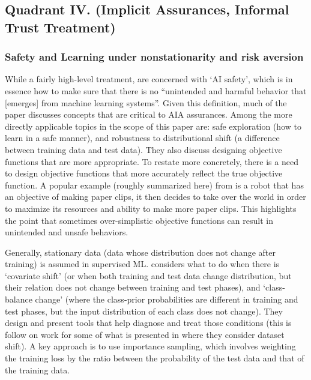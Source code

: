 \subsection{Quadrant IV. (Implicit Assurances, Informal Trust Treatment)}\label{sec:q4}



\subsubsection{Safety and Learning under nonstationarity and risk aversion} \label{sec:safety}
    While a fairly high-level treatment, \citet{Amodei2016-xi} are concerned with `AI safety', which is in essence how to make sure that there is no ``unintended and harmful behavior that [emerges] from machine learning systems''. Given this definition, much of the paper discusses concepts that are critical to AIA assurances. Among the more directly applicable topics in the scope of this paper are: safe exploration (how to learn in a safe manner), and robustness to distributional shift (a difference between training data and test data). They also discuss designing objective functions that are more appropriate. To restate more concretely, there is a need to design objective functions that more accurately reflect the true objective function. A popular example (roughly summarized here) from \citet{Bostrom2014-fz} is a robot that has an objective of making paper clips, it then decides to take over the world in order to maximize its resources and ability to make more paper clips. This highlights the point that sometimes over-simplistic objective functions can result in unintended and unsafe behaviors.

    Generally, stationary data (data whose distribution does not change after training) is assumed in supervised ML. \citet{Sugiyama2013-ci} considers what to do when there is `covariate shift' (or when both training and test data change distribution, but their relation does not change between training and test phases), and `class-balance change' (where the class-prior probabilities are different in training and test phases, but the input distribution of each class does not change). They design and present tools that help diagnose and treat those conditions (this is follow on work for some of what is presented in \citet{Quinonero-Candela2009-fj} where they consider dataset shift). A key approach is to use importance sampling, which involves weighting the training loss by the ratio between the probability of the test data and that of the training data.

